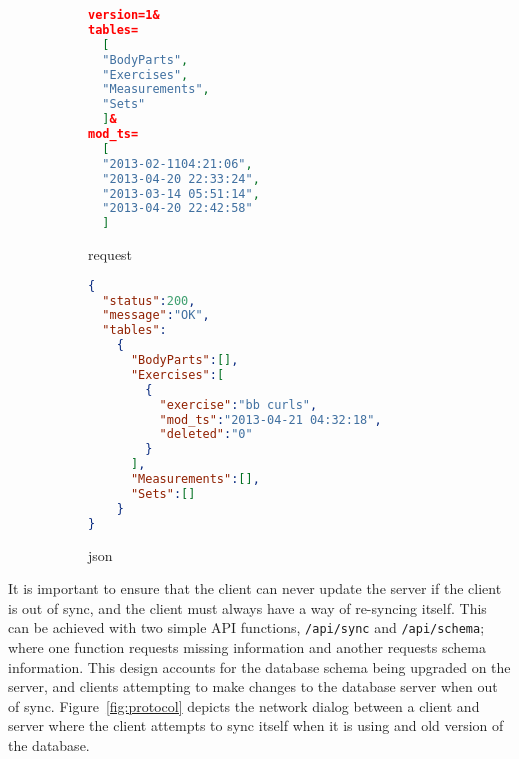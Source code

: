 \begin{figure}[h!]
\begin{subfigure}[b]{0.23\textwidth}
\begin{lstlisting}[language=json]
version=1&
tables=
  [
  "BodyParts",
  "Exercises",
  "Measurements",
  "Sets"
  ]&
mod_ts=
  [
  "2013-02-1104:21:06",
  "2013-04-20 22:33:24",
  "2013-03-14 05:51:14",
  "2013-04-20 22:42:58"
  ]
\end{lstlisting}
\caption{request}
\label{fig:gull}
\end{subfigure}%
\begin{subfigure}[b]{0.27\textwidth}
\begin{lstlisting}[language=json]
{
  "status":200,
  "message":"OK",
  "tables":
    {
      "BodyParts":[],
      "Exercises":[
        {
          "exercise":"bb curls",
          "mod_ts":"2013-04-21 04:32:18",
          "deleted":"0"
        }
      ],
      "Measurements":[],
      "Sets":[]
    }
}
\end{lstlisting}
\caption{json}
\label{fig:tiger}
\end{subfigure}
\caption{\sync}\label{fig:animals} \end{figure}






It is important to ensure that the client can never update the server if the
client is out of sync, and the client must always have a way of re-syncing
itself.  This can be achieved with two simple API functions, \texttt{/api/sync}
and \texttt{/api/schema}; where one function requests missing information and
another requests schema information. This design accounts for the database
schema being upgraded on the server, and clients attempting to make changes to
the database server when out of sync. Figure~\ref{fig:protocol} depicts the
network dialog between a client and server where the client attempts to sync
itself when it is using and old version of the database. 




